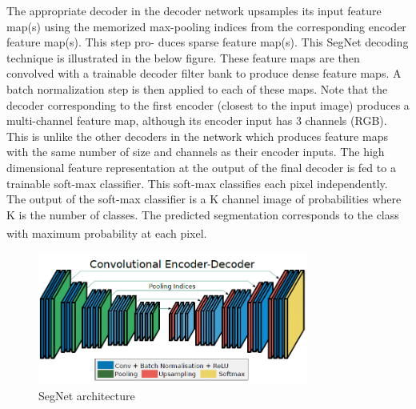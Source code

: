 The appropriate decoder in the decoder network upsamples its input feature map(s) using the memorized max-pooling indices from the corresponding encoder feature map(s). This step pro- duces sparse feature map(s). This SegNet decoding technique is illustrated in the below figure.
These feature maps are then convolved with a trainable decoder filter bank to produce dense feature maps. A batch normalization step is then applied to each of these maps. Note that the decoder corresponding to the first encoder (closest to the input image) produces a multi-channel feature map, although its encoder input has 3 channels (RGB).
This is unlike the other decoders in the network which produces feature maps with the same number of size and channels as their encoder inputs. The high dimensional feature representation at the output of the final decoder is fed to a trainable soft-max classifier.
This soft-max classifies each pixel independently. The output of the soft-max classifier is a K channel image of probabilities where K is the number of classes. The predicted segmentation corresponds to the class with maximum probability at each pixel. \textsuperscript{\cite{badrinarayanan2017segnet}}

\vspace{0.2in}

\begin{figure}[H]
\centering
  \vspace{-0.1in}
    \centerline{\includegraphics[width = 3.5in]{../images/segnet.png}}
    \caption{SegNet architecture}
\end{figure}

